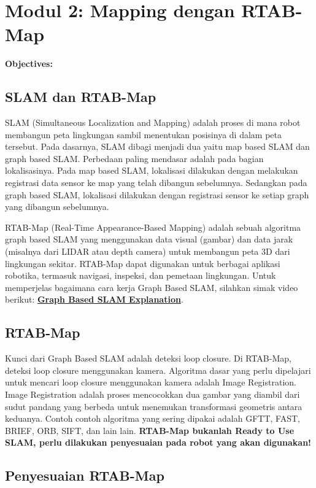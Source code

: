 \documentclass{article}
\begin{document}
\section{Modul 2: Mapping dengan RTAB-Map}
\textbf{Objectives:}

\subsection{SLAM dan RTAB-Map}
SLAM (Simultaneous Localization and Mapping) adalah proses di mana robot membangun peta lingkungan sambil menentukan posisinya di dalam peta tersebut. Pada dasarnya, SLAM dibagi menjadi dua yaitu map based SLAM dan graph based SLAM. Perbedaan paling mendasar adalah pada bagian lokalisasinya. Pada map based SLAM, lokalisasi dilakukan dengan melakukan registrasi data sensor ke map yang telah dibangun sebelumnya. Sedangkan pada graph based SLAM, lokalisasi dilakukan dengan registrasi sensor ke setiap graph yang dibangun sebelumnya. 
\par    
RTAB-Map (Real-Time Appearance-Based Mapping) adalah sebuah algoritma graph based SLAM yang menggunakan data visual (gambar) dan data jarak (misalnya dari LIDAR atau depth camera) untuk membangun peta 3D dari lingkungan sekitar. RTAB-Map dapat digunakan untuk berbagai aplikasi robotika, termasuk navigasi, inspeksi, dan pemetaan lingkungan. Untuk memperjelas bagaimana cara kerja Graph Based SLAM, silahkan simak video berikut: \href{https://youtu.be/saVZtgPyyJQ?si=qHGGJnJUz-iB19UF}{\textbf{Graph Based SLAM Explanation}}. 

\subsection{RTAB-Map}
Kunci dari Graph Based SLAM adalah deteksi loop closure. Di RTAB-Map, deteksi loop closure menggunakan kamera. Algoritma dasar yang perlu dipelajari untuk mencari loop closure menggunakan kamera adalah Image Registration. Image Registration adalah proses mencocokkan dua gambar yang diambil dari sudut pandang yang berbeda untuk menemukan transformasi geometris antara keduanya. Contoh contoh algoritma yang sering dipakai adalah GFTT, FAST, BRIEF, ORB, SIFT, dan lain lain.        
\newline
\textbf{RTAB-Map bukanlah Ready to Use SLAM, perlu dilakukan penyesuaian pada robot yang akan digunakan!}

\subsection{Penyesuaian RTAB-Map}
\end{document}
